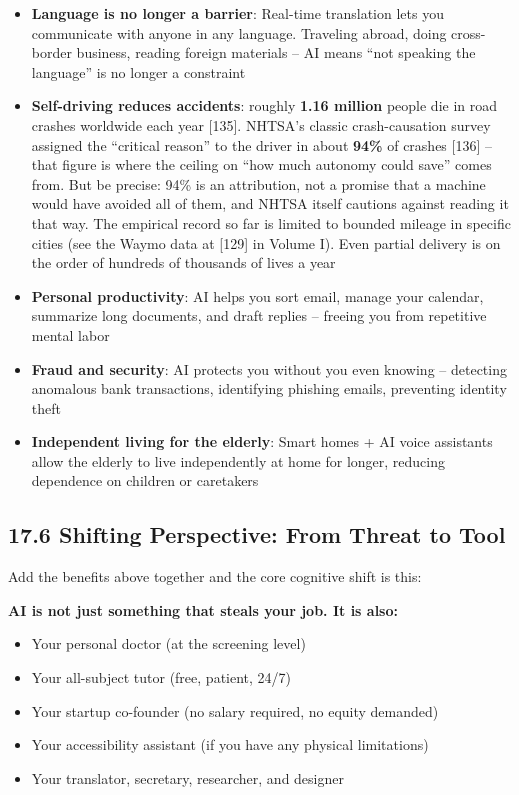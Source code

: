 \documentclass[11pt,a4paper]{article}
\begin{document}
\begin{itemize}
  \item \textbf{Language is no longer a barrier}: Real-time translation lets you communicate with anyone in any language. Traveling abroad, doing cross-border business, reading foreign materials -- AI means ``not speaking the language'' is no longer a constraint
  \item \textbf{Self-driving reduces accidents}: roughly \textbf{1.16 million} people die in road crashes worldwide each year [135]. NHTSA's classic crash-causation survey assigned the ``critical reason'' to the driver in about \textbf{94\%} of crashes [136] -- that figure is where the ceiling on ``how much autonomy could save'' comes from. But be precise: 94\% is an attribution, not a promise that a machine would have avoided all of them, and NHTSA itself cautions against reading it that way. The empirical record so far is limited to bounded mileage in specific cities (see the Waymo data at [129] in Volume I). Even partial delivery is on the order of hundreds of thousands of lives a year
  \item \textbf{Personal productivity}: AI helps you sort email, manage your calendar, summarize long documents, and draft replies -- freeing you from repetitive mental labor
  \item \textbf{Fraud and security}: AI protects you without you even knowing -- detecting anomalous bank transactions, identifying phishing emails, preventing identity theft
  \item \textbf{Independent living for the elderly}: Smart homes + AI voice assistants allow the elderly to live independently at home for longer, reducing dependence on children or caretakers
\end{itemize}

\subsection{17.6 Shifting Perspective: From Threat to Tool}

Add the benefits above together and the core cognitive shift is this:

\textbf{AI is not just something that steals your job. It is also:}

\begin{itemize}
  \item Your personal doctor (at the screening level)
  \item Your all-subject tutor (free, patient, 24/7)
  \item Your startup co-founder (no salary required, no equity demanded)
  \item Your accessibility assistant (if you have any physical limitations)
  \item Your translator, secretary, researcher, and designer
\end{itemize}
\end{document}
